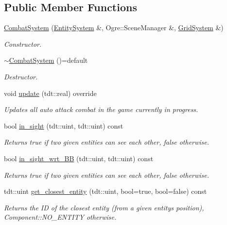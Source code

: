 \subsection*{Public Member Functions}
\begin{DoxyCompactItemize}
\item 
\hyperlink{class_combat_system_ad7d0ab805abdae93ccaa9d09f9d40153}{Combat\+System} (\hyperlink{class_entity_system}{Entity\+System} \&, Ogre\+::\+Scene\+Manager \&, \hyperlink{class_grid_system}{Grid\+System} \&)
\begin{DoxyCompactList}\small\item\em Constructor. \end{DoxyCompactList}\item 
\hyperlink{class_combat_system_ae95bc02a8ac9237e5dca11f56ecefe9e}{$\sim$\+Combat\+System} ()=default
\begin{DoxyCompactList}\small\item\em Destructor. \end{DoxyCompactList}\item 
void \hyperlink{class_combat_system_a2c284a065f150a9fb67dae0f1229db37}{update} (tdt\+::real) override
\begin{DoxyCompactList}\small\item\em Updates all auto attack combat in the game currently in progress. \end{DoxyCompactList}\item 
bool \hyperlink{class_combat_system_a9e4c1c2747bd800a6766a59f633c7177}{in\+\_\+sight} (tdt\+::uint, tdt\+::uint) const 
\begin{DoxyCompactList}\small\item\em Returns true if two given entities can see each other, false otherwise. \end{DoxyCompactList}\item 
bool \hyperlink{class_combat_system_ad573eb3a0e7751ffc5a6be31f6443c9f}{in\+\_\+sight\+\_\+wrt\+\_\+\+BB} (tdt\+::uint, tdt\+::uint) const 
\begin{DoxyCompactList}\small\item\em Returns true if two given entities can see each other, false otherwise. \end{DoxyCompactList}\item 
tdt\+::uint \hyperlink{class_combat_system_acc161d46979586d368d28a7ee92b79e8}{get\+\_\+closest\+\_\+entity} (tdt\+::uint, bool=true, bool=false) const 
\begin{DoxyCompactList}\small\item\em Returns the ID of the closest entity (from a given entity\textquotesingle{}s position), Component\+::\+N\+O\+\_\+\+E\+N\+T\+I\+TY otherwise. \end{DoxyCompactList}\item 

\end{DoxyCompactItemize}
